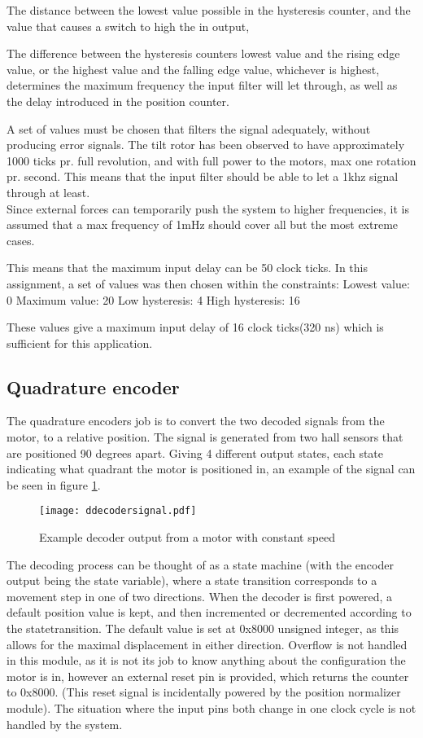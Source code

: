 The distance between the lowest value possible in the hysteresis counter, and the value that causes a switch to high the in output,

The difference between the hysteresis counters lowest value and the rising edge value, or the highest value and the falling edge value, whichever is highest, determines the maximum frequency the input filter will let through, as well as the delay introduced in the position counter.

A set of values must be chosen that filters the signal adequately, without producing error signals. The tilt rotor has been observed to have approximately 1000 ticks pr. full revolution, and with full power to the motors, max one rotation pr. second.
This means that the input filter should be able to let a 1khz signal through at least. \\ 
Since external forces can temporarily push the system to higher frequencies, it is assumed that a max frequency of 1mHz should cover all but the most extreme cases.

This means that the maximum input delay can be 50 clock ticks.
In this assignment, a set of values was then chosen within the constraints: 
Lowest value: 0
Maximum value: 20
Low hysteresis: 4
High hysteresis: 16

These values give a maximum input delay of 16 clock ticks(320 ns) which is sufficient for this application.

\subsection{Quadrature encoder}
The quadrature encoders job is to convert the two decoded signals from the motor, to a relative position. The signal is generated from two hall sensors that are positioned 90 degrees apart. Giving 4 different output states, each state indicating what quadrant the motor is positioned in, an example of the signal can be seen in figure \ref{fig:decodersignal}.
\begin{figure}[htb]
\centering
\texttt{[image: ddecodersignal.pdf]}
\caption{Example decoder output from a motor with constant speed}
\label{fig:decodersignal}
\end{figure}
The decoding process can be thought of as a state machine (with the encoder output being the state variable), where a state transition corresponds to a movement step in one of two directions.
When the decoder is first powered, a default position value is kept, and then incremented or decremented according to the statetransition. The default value is set at 0x8000 unsigned integer, as this allows for the maximal displacement in either direction. 
Overflow is not handled in this module, as it is not its job to know anything about the configuration the motor is in, however an external reset pin is provided, which returns the counter to 0x8000. (This reset signal is incidentally powered by the position normalizer module).
The situation where the input pins both change in one clock cycle is not handled by the system.

